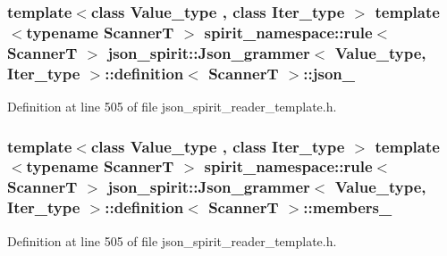 \hypertarget{classjson__spirit_1_1_json__grammer_1_1definition_a2a4514fb3de3c730ab06a9efabed0cd2}{}
\subsubsection[{json\+\_\+}]{\setlength{\rightskip}{0pt plus 5cm}template$<$class Value\+\_\+type , class Iter\+\_\+type $>$ template$<$typename Scanner\+T $>$ spirit\+\_\+namespace\+::rule$<$ Scanner\+T $>$ {\bf json\+\_\+spirit\+::\+Json\+\_\+grammer}$<$ {\bf Value\+\_\+type}, Iter\+\_\+type $>$\+::{\bf definition}$<$ Scanner\+T $>$\+::json\+\_\+}\label{classjson__spirit_1_1_json__grammer_1_1definition_a2a4514fb3de3c730ab06a9efabed0cd2}


Definition at line 505 of file json\+\_\+spirit\+\_\+reader\+\_\+template.\+h.

\hypertarget{classjson__spirit_1_1_json__grammer_1_1definition_a47e593c30af21ca336a5e0b8643fbf0c}{}
\subsubsection[{members\+\_\+}]{\setlength{\rightskip}{0pt plus 5cm}template$<$class Value\+\_\+type , class Iter\+\_\+type $>$ template$<$typename Scanner\+T $>$ spirit\+\_\+namespace\+::rule$<$ Scanner\+T $>$ {\bf json\+\_\+spirit\+::\+Json\+\_\+grammer}$<$ {\bf Value\+\_\+type}, Iter\+\_\+type $>$\+::{\bf definition}$<$ Scanner\+T $>$\+::members\+\_\+}\label{classjson__spirit_1_1_json__grammer_1_1definition_a47e593c30af21ca336a5e0b8643fbf0c}


Definition at line 505 of file json\+\_\+spirit\+\_\+reader\+\_\+template.\+h.

\hypertarget{classjson__spirit_1_1_json__grammer_1_1definition_a664513d2923170ddf2a27fadc5116eb5}{}
